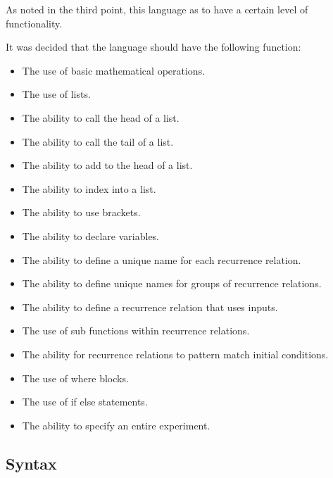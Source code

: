 \documentclass{article}
\begin{document}
As noted in the third point, this language as to have a certain level of functionality. 

It was decided that the language should have the following function:
\begin{itemize}
  \item The use of basic mathematical operations.%
  \item The use of lists.%
  \item The ability to call the head of a list.%
  \item The ability to call the tail of a list.%
  \item The ability to add to the head of a list.%
  \item The ability to index into a list.%
  \item The ability to use brackets.%
  \item The ability to declare variables.  
  \item The ability to define a unique name for each recurrence relation.
  \item The ability to define unique names for groups of recurrence relations. 
  \item The ability to define a recurrence relation that uses inputs.
  \item The use of sub functions within recurrence relations. 
  \item The ability for recurrence relations to pattern match initial conditions.  
  \item The use of where blocks.%
  \item The use of if else statements.%
  \item The ability to specify an entire experiment.  
\end{itemize}



\subsection{Syntax}

\end{document}
